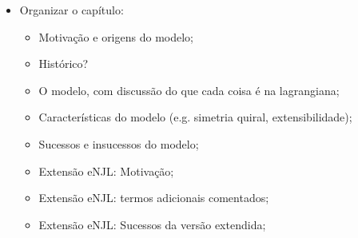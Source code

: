 \begin{itemize}
	\item Organizar o capítulo:
		\begin{itemize}
			\item Motivação e origens do modelo;
			\item Histórico?
			\item O modelo, com discussão do que cada coisa é na lagrangiana;
			\item Características do modelo (e.g. simetria quiral, extensibilidade);
			\item Sucessos e insucessos do modelo;
			\item Extensão eNJL: Motivação;
			\item Extensão eNJL: termos adicionais comentados;
			\item Extensão eNJL: Sucessos da versão extendida;
		\end{itemize}
\end{itemize}


